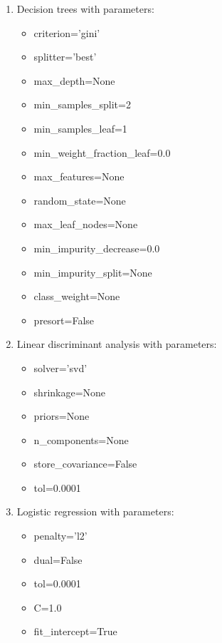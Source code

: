 \documentclass{article} %
\begin{document}
\begin{enumerate}
    \item Decision trees with parameters:
    \begin{multicols}{2}
    \begin{itemize}
        \item criterion=’gini’
        \item splitter=’best’ 
        \item max\_depth=None 
        \item min\_samples\_split=2
        \item min\_samples\_leaf=1 
        \item min\_weight\_fraction\_leaf=0.0 
        \item max\_features=None 
        \item random\_state=None 
        \item max\_leaf\_nodes=None 
        \item min\_impurity\_decrease=0.0 
        \item min\_impurity\_split=None 
        \item class\_weight=None 
        \item presort=False
    \end{itemize}
    \end{multicols}
    \item Linear discriminant analysis with parameters:
    \begin{multicols}{2}
    \begin{itemize}
        \item solver=’svd’ 
        \item shrinkage=None 
        \item priors=None 
        \item n\_components=None 
        \item store\_covariance=False 
        \item tol=0.0001
    \end{itemize}
    \end{multicols}
    \item Logistic regression with parameters:
    \begin{multicols}{2}
    \begin{itemize}
        \item penalty=’l2’
        \item dual=False
        \item tol=0.0001
        \item C=1.0
        \item fit\_intercept=True

\end{itemize}
\end{multicols}
\end{enumerate}
\end{document}

